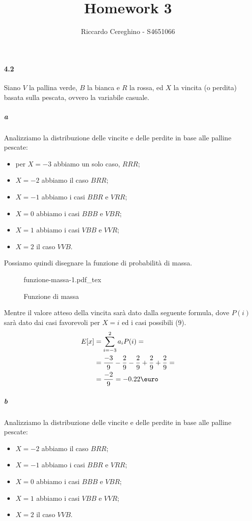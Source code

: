 \documentclass{article}
\newcommand{\incfig}[2][1]{%
    \def\svgwidth{#1\columnwidth}
    {#2.pdf_tex}
}
\begin{document}
\title{Homework 3}
\author{Riccardo Cereghino - S4651066}
\maketitle

\paragraph{4.2}%
\label{par:4.2}
Siano $V$ la pallina verde, $B$ la bianca e $R$ la rossa, ed $X$ la vincita (o
perdita) basata sulla pescata, ovvero la variabile casuale.

\subparagraph{a}%
\label{subp:a}
Analizziamo la distribuzione delle vincite e delle perdite in base alle palline
pescate:
\begin{itemize}
  \item per $X=-3$ abbiamo un solo caso, $RRR$;
  \item $X=-2$ abbiamo il caso $BRR$;
  \item $X=-1$ abbiamo i casi $BBR$ e $VRR$;
  \item $X=0$ abbiamo i casi $BBB$ e $VBR$;
  \item $X=1$ abbiamo i casi $VBB$ e $VVR$;
  \item $X=2$ il caso $VVB$.
\end{itemize}

Possiamo quindi disegnare la funzione di probabilità di massa.
\begin{figure}[ht]
    \centering
    \incfig[0.6]{funzione-massa-1}
    \caption{Funzione di massa}
    \label{fig:funzione-massa-1}
\end{figure}

Mentre il valore atteso della vincita sarà dato dalla seguente formula, dove
$P(i)$ sarà dato dai casi favorevoli per $X=i$ ed i casi possibili ($9$).
\[
  \begin{split}
  E[x]&= \sum^{2}_{i=-3} a_i P(i)=\\
  &= \frac{-3}{9}-\frac{2}{9}-\frac{2}{9}+\frac{2}{9}+\frac{2}{9}=\\
  &= \frac{-2}{9} = -0.22\text{\euro}
  \end{split}
\]

\subparagraph{b}%
\label{subp:b}
Analizziamo la distribuzione delle vincite e delle perdite in base alle palline
pescate:
\begin{itemize}
  \item $X=-2$ abbiamo il caso $BRR$;
  \item $X=-1$ abbiamo i casi $BBR$ e $VRR$;
  \item $X=0$ abbiamo i casi $BBB$ e $VBR$;
  \item $X=1$ abbiamo i casi $VBB$ e $VVR$;
  \item $X=2$ il caso $VVB$.
\end{itemize}
\end{document}
